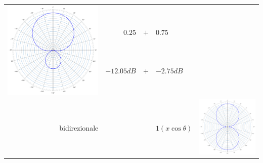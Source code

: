 \begin{table}[ht]
\begin{center}
\begin{tabular}{rrcll}
 \multirow{4}{*}{\begin{minipage}{.25\textwidth}\includegraphics[width=\linewidth]{CAPITOLI/_TIKZ/POLAR/hypercardioid}\end{minipage}} \\
                & $0.25$       & $+$ & $0.75$               & \\
                & $-12.05dB$ & $+$ & $-2.75dB$              & \\ %
& \\
\hline
bidirezionale   &              &     & $1(x\cos\theta)$     &
 \multirow{4}{*}{\begin{minipage}{.25\textwidth}\includegraphics[width=\linewidth]{CAPITOLI/_TIKZ/POLAR/fig8}\end{minipage}} \\

\end{tabular}
\end{center}
\end{table}
